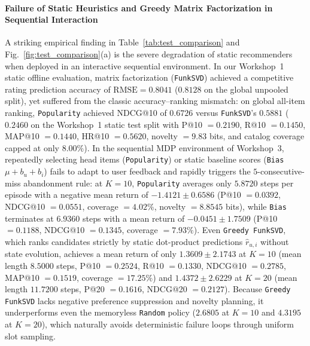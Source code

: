 \paragraph{Failure of Static Heuristics and Greedy Matrix Factorization in Sequential Interaction}
A striking empirical finding in Table~\ref{tab:test_comparison} and Fig.~\ref{fig:test_comparison}(a) is the severe degradation of static recommenders when deployed in an interactive sequential environment. In our Workshop~1 static offline evaluation, matrix factorization (\texttt{FunkSVD}) achieved a competitive rating prediction accuracy of $\text{RMSE} = 0.8041$ ($0.8128$ on the global unpooled split), yet suffered from the classic accuracy--ranking mismatch: on global all-item ranking, \texttt{Popularity} achieved NDCG@10 of $0.6726$ versus \texttt{FunkSVD}'s $0.5881$ ($0.2460$ on the Workshop~1 static test split with P@10 $= 0.2190$, R@10 $= 0.1450$, MAP@10 $= 0.1440$, HR@10 $= 0.5620$, novelty $= 9.83$ bits, and catalog coverage capped at only $8.00\%$). In the sequential MDP environment of Workshop~3, repeatedly selecting head items (\texttt{Popularity}) or static baseline scores (\texttt{Bias} $\mu + b_u + b_i$) fails to adapt to user feedback and rapidly triggers the $5$-consecutive-miss abandonment rule: at $K=10$, \texttt{Popularity} averages only $5.8720$ steps per episode with a negative mean return of $-1.4121 \pm 0.6586$ (P@10 $= 0.0392$, NDCG@10 $= 0.0551$, coverage $= 4.02\%$, novelty $= 8.8545$ bits), while \texttt{Bias} terminates at $6.9360$ steps with a mean return of $-0.0451 \pm 1.7509$ (P@10 $= 0.1188$, NDCG@10 $= 0.1345$, coverage $= 7.93\%$). Even \texttt{Greedy FunkSVD}, which ranks candidates strictly by static dot-product predictions $\hat{r}_{u,i}$ without state evolution, achieves a mean return of only $1.3609 \pm 2.1743$ at $K=10$ (mean length $8.5000$ steps, P@10 $= 0.2524$, R@10 $= 0.1330$, NDCG@10 $= 0.2785$, MAP@10 $= 0.1519$, coverage $= 17.25\%$) and $1.4372 \pm 2.6229$ at $K=20$ (mean length $11.7200$ steps, P@20 $= 0.1616$, NDCG@20 $= 0.2127$). Because \texttt{Greedy FunkSVD} lacks negative preference suppression and novelty planning, it underperforms even the memoryless \texttt{Random} policy ($2.6805$ at $K=10$ and $4.3195$ at $K=20$), which naturally avoids deterministic failure loops through uniform slot sampling.

